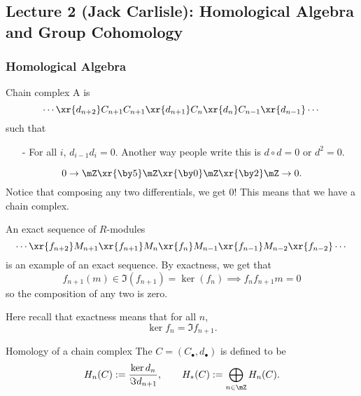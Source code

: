 \newpage

\subsection{Lecture 2 (Jack Carlisle): Homological Algebra and Group Cohomology}

\subsubsection{Homological Algebra}
\begin{definition}{Chain complex}{}
    A  is $$\cdots \xr{d_{n+2}}C_{n+1}C_{n+1}\xr{d_{n+1}}C_{n}\xr{d_n}C_{n-1}\xr{d_{n-1}}\cdots$$ such that 
    \begin{itemize}
        \item[-] For all $i$, $d_{i-1}d_i = 0$. Another way people write this is $d\circ d =0$ or $d^2 =0$.  
    \end{itemize}
\end{definition}
\begin{example}{}{}\label{example:w1d2ex1}
    $$0\to \mZ\xr{\by 5} \mZ\xr{\by 0} \mZ\xr{\by 2}\mZ\to 0.$$
    Notice that composing any two differentials, we get 0! This means that we have a chain complex. 
\end{example}
\begin{example}{}{}\label{example:w1d2ex2}
    An exact sequence of $R$-modules $$\cdots \xr{f_{n+2}} M_{n+1}\xr{f_{n+1}} M_n\xr{f_{n}} M_{n-1}\xr{f_{n-1}} M_{n-2}\xr{f_{n-2}} \cdots$$ is an example of an exact sequence. By exactness, we get that $$f_{n+1}(m) \in \Im(f_{n+1}) = \ker(f_n)\implies f_nf_{n+1}m = 0$$ so the composition of any two is zero. 

    Here recall that exactness means that for all $n$, $$\ker f_n = \Im f_{n+1}.$$
\end{example}

\begin{definition}{Homology of a chain complex}{}
    The  $C = (C_\bullet, d_\bullet)$ is defined to be $$H_n(C):= \frac{\ker d_n}{\Im d_{n+1}}, \qquad H_\ast(C):=\bigoplus_{n\in \mZ}H_n(C).$$
\end{definition}

